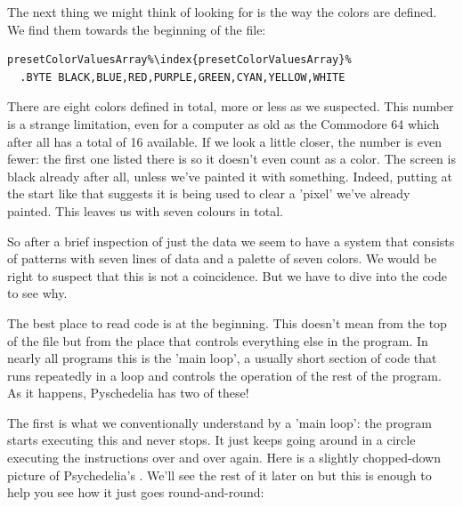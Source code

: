 The next thing we might think of looking for is the way the colors are defined. We find them towards the beginning of the file:
\begin{lstlisting}[escapechar=\%]
presetColorValuesArray%\index{presetColorValuesArray}%
  .BYTE BLACK,BLUE,RED,PURPLE,GREEN,CYAN,YELLOW,WHITE
\end{lstlisting}

There are eight colors defined in total, more or less as we suspected. This number is a strange limitation, even for a computer as old
as the Commodore 64 which after all has a total of 16 available. If we look a little closer, the number is even
fewer: the first one listed there is  so it doesn't even count as a color. The screen is black already after all, unless we've
painted it with something. Indeed, putting  at the 
start like that suggests it is being used to clear a 'pixel' we've already painted. This leaves us with seven 
colours in total. 

So after a brief inspection of just the data we seem to have a system that consists of patterns with seven lines of data and a palette
of seven colors. We would be right to suspect that this is not a coincidence. But we have to dive into the code to see why.

The best place to read code is at the beginning. This doesn't mean from the top of the file but from the place that controls everything
else in the program. In nearly all programs this is the 'main loop', a usually short section of code that runs repeatedly in a loop and
controls the operation of the rest of the program. As it happens, Pyschedelia has two of these! 

The first is what we conventionally 
understand by a 'main loop': the program starts executing this and never stops. It just keeps going around in a circle executing the instructions 
over and over again. Here is a slightly chopped-down picture of Psychedelia's . We'll see the rest of it later on
but this is enough to help you see how it just goes round-and-round:

